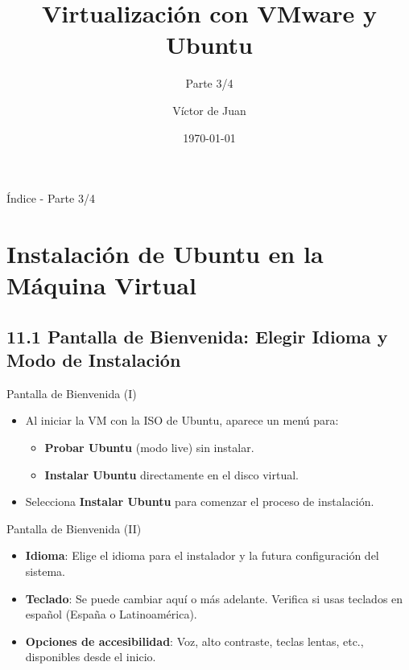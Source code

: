 \documentclass{beamer}
\title{Virtualización con VMware y Ubuntu}
\subtitle{Parte 3/4}
\author{Víctor de Juan}
\date{\today}
\begin{document}
\begin{frame}
    \titlepage
\end{frame}

\begin{frame}{Índice - Parte 3/4}
    \tableofcontents[
    hideallsubsections]
\end{frame}

\section{Instalación de Ubuntu en la Máquina Virtual}

\subsection{11.1 Pantalla de Bienvenida: Elegir Idioma y Modo de Instalación}
\begin{frame}{Pantalla de Bienvenida (I)}
    \begin{itemize}
        \item Al iniciar la VM con la ISO de Ubuntu, aparece un menú para:
        \begin{itemize}
            \item \textbf{Probar Ubuntu} (modo live) sin instalar.
            \item \textbf{Instalar Ubuntu} directamente en el disco virtual.
        \end{itemize}
        \item Selecciona \textbf{Instalar Ubuntu} para comenzar el proceso de instalación.
    \end{itemize}
\end{frame}

\begin{frame}{Pantalla de Bienvenida (II)}
    \begin{itemize}
        \item \textbf{Idioma}: Elige el idioma para el instalador y la futura configuración del sistema.
        \item \textbf{Teclado}: Se puede cambiar aquí o más adelante. Verifica si usas teclados en español (España o Latinoamérica).
        \item \textbf{Opciones de accesibilidad}: Voz, alto contraste, teclas lentas, etc., disponibles desde el inicio.
    \end{itemize}
\end{frame}
\end{document}
